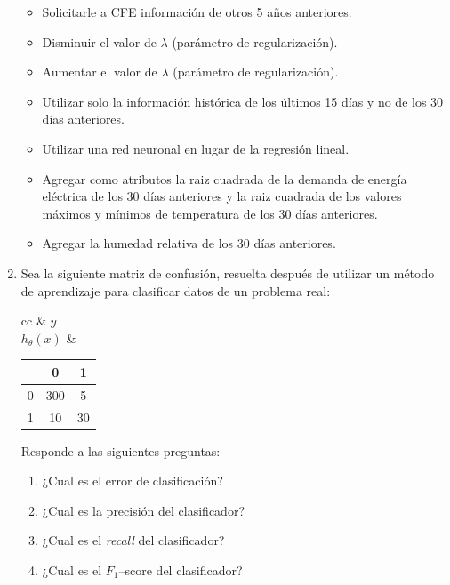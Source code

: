 \documentclass[11pt]{article}
\begin{document}
\begin{enumerate}
  \begin{itemize}
  \item Solicitarle a CFE información de otros 5 años anteriores.
  \item Disminuir el valor de $\lambda$ (parámetro de regularización).
  \item Aumentar el valor de $\lambda$ (parámetro de regularización).
  \item Utilizar solo la información histórica de los últimos 15 días y no de
    los 30 días anteriores.
  \item Utilizar una red neuronal en lugar de la regresión lineal.
  \item Agregar como atributos la raiz cuadrada de la demanda de energía
    eléctrica de los 30 días anteriores y la raiz cuadrada de los valores
    máximos y mínimos de temperatura de los 30 días anteriores.
  \item Agregar la humedad relativa de los 30 días anteriores.
  \end{itemize}

\item Sea la siguiente matriz de confusión, resuelta después de utilizar un
  método de aprendizaje para clasificar datos de un problema real:

  \begin{center}
    \begin{tabular}{cc}
      & $y$ \\
      $h_\theta(x)$ &
                      \begin{tabular}{c|cc}
                        & 0 & 1 \\
                        \hline
                        0 & 300 & 5 \\
                        1 & 10 & 30
                      \end{tabular}
    \end{tabular}
  \end{center}

  Responde a las siguientes preguntas:
  \vspace{3mm}
  \begin{enumerate}
  \item ¿Cual es el error de clasificación? 
  \vspace{3mm}
  \item ¿Cual es la precisión del clasificador? 
  \vspace{3mm}
  \item ¿Cual es el \emph{recall} del clasificador? 
  \vspace{3mm}
  \item ¿Cual es el $F_1$--score del clasificador? 
  \end{enumerate}


\end{enumerate}
\end{document}

